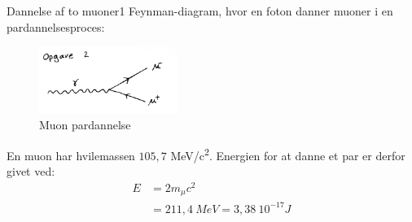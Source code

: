 \begin{opgave}{Dannelse af to muoner}{1}
Feynman-diagram, hvor en foton danner muoner i en pardannelsesproces:
\begin{figure}[h]
  \centering
  \includegraphics[width=0.4\textwidth]{KernePartikel/opg2.png}
  \caption{Muon pardannelse}
  \label{fig:opg2}
\end{figure}
En muon har hvilemassen $105,7$ \si{MeV/c^2}. Energien for at danne et par er derfor givet ved:
\begin{align*}
E &= 2 m_{\mu} c^2 \\
&= 211,4~\si{MeV} = 3,38~ 10^{-17} \si{J}
\end{align*}
\end{opgave}

